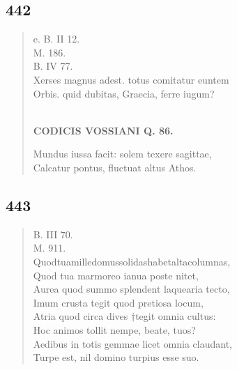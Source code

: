 \documentclass[11pt, a4paper]{report}
\begin{document}
            \subsection*{442}
      \begin{verse}
      e. B. II 12. \\ M. 186. \\ B. IV 77. \\ Xerses magnus adest. totus comitatur euntem \\ Orbis. quid dubitas, Graecia, ferre iugum? \\ 
        ﻿\pagebreak 
    \begin{center} \textbf{CODICIS VOSSIANI Q. 86.} \end{center}Mundus iussa facit: solem texere sagittae, \\ Calcatur pontus, fluctuat altus Athos. \\ 
      \end{verse}
  
            \subsection*{443}
      \begin{verse}
      B. III 70. \\ M. 911. \\ Quodtuamilledomussolidashabetaltacolumnas, \\ Quod tua marmoreo ianua poste nitet, \\ Aurea quod summo splendent laquearia tecto, \\ Imum crusta tegit quod pretiosa locum, \\ Atria quod circa dives †tegit omnia cultus: \\ Hoc animos tollit nempe, beate, tuos? \\ Aedibus in totis gemmae licet omnia claudant, \\ Turpe est, nil domino turpius esse suo. \\ 
      \end{verse}
  
\end{document}

